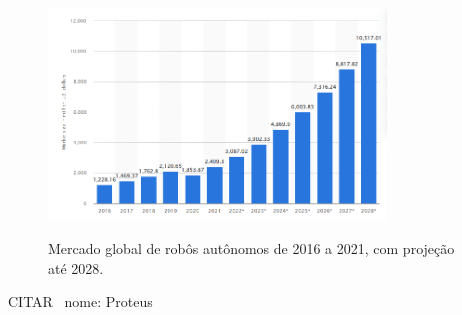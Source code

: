 \documentclass[repeatfields,xlists,xpacks,oneside,yearsonly]{ufrgscca}
\begin{document}
\begin{figure}[htbp]
    {
        \centering
        \caption{Mercado global de robôs autônomos de 2016 a 2021, com projeção até 2028.}
        \label{fig:mercado_robo}
        \includegraphics[width=0.8\textwidth]{mercado_robo}\\
    }
    {}
\end{figure}

CITAR~\cite{amazon_robot} nome: Proteus


%
%
\end{document}

